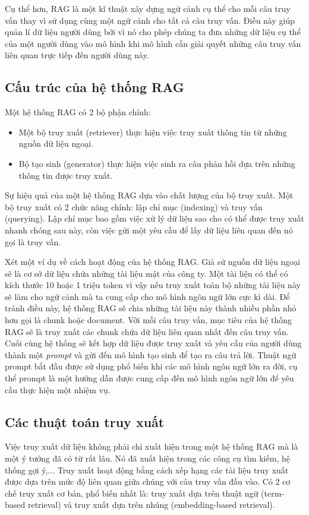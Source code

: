 Cụ thể hơn, RAG là một kĩ thuật xây dựng ngữ cảnh cụ thể cho mỗi câu truy vấn thay vì sử dụng cùng một ngữ cảnh cho tất cả câu truy vấn. Điều này giúp quản lí dữ liệu người dùng bởi vì nó cho phép chúng ta đưa những dữ liệu cụ thể của một người dùng vào mô hình khi mô hình cần giải quyết những câu truy vấn liên quan trực tiếp đến người dùng này.

\vspace{1em}
\subsection{Cấu trúc của hệ thống RAG}

Một hệ thống RAG có 2 bộ phận chính: 
\begin{itemize}
    \item Một bộ truy xuất (retriever) thực hiện việc truy xuất thông tin từ những nguồn dữ liệu ngoại.
    \item Bộ tạo sinh (generator) thực hiện việc sinh ra câu phản hồi dựa trên những thông tin được truy xuất.
\end{itemize}

Sự hiệu quả của một hệ thống RAG dựa vào chất lượng của bộ truy xuất. Một bộ truy xuất có 2 chức năng chính: lập chỉ mục (indexing) và truy vấn (querying). Lập chỉ mục bao gồm việc xử lý dữ liệu sao cho có thể được truy xuất nhanh chóng sau này, còn việc gửi một yêu cầu để lấy dữ liệu liên quan đến nó gọi là truy vấn.

Xét một ví dụ về cách hoạt động của hệ thống RAG. Giả sử nguồn dữ liệu ngoại sẽ là cơ sở dữ liệu chứa những tài liệu mật của công ty. Một tài liệu có thể có kích thước 10 hoặc 1 triệu token vì vậy nếu truy xuất toàn bộ những tài liệu này sẽ làm cho ngữ cảnh mà ta cung cấp cho mô hình ngôn ngữ lớn cực kì dài. Để tránh điều này, hệ thống RAG sẽ chia những tài liệu này thành nhiều phần nhỏ hơn gọi là chunk hoặc document. Với mỗi câu truy vấn, mục tiêu của hệ thống RAG sẽ là truy xuất các chunk chứa dữ liệu liên quan nhất đến câu truy vấn. Cuối cùng hệ thống sẽ kết hợp dữ liệu được truy xuất và yêu cầu của người dùng thành một \textit{prompt} và gửi đến mô hình tạo sinh để tạo ra câu trả lời. Thuật ngữ prompt bắt đầu được sử dụng phổ biến khi các mô hình ngôn ngữ lớn ra đời, cụ thể prompt là một hướng dẫn được cung cấp đến mô hình ngôn ngữ lớn để yêu cầu thực hiện một nhiệm vụ.

\vspace{1em}
\subsection{Các thuật toán truy xuất}
Việc truy xuất dữ liệu không phải chỉ xuất hiện trong một hệ thống RAG mà là một ý tưởng đã có từ rất lâu. Nó đã xuất hiện trong các công cụ tìm kiếm, hệ thống gợi ý,... Truy xuất hoạt động bằng cách xếp hạng các tài liệu truy xuất được dựa trên mức độ liên quan giữa chúng với câu truy vấn đầu vào. Có 2 cơ chế truy xuất cơ bản, phổ biến nhất là: truy xuất dựa trên thuật ngữ (term-based retrieval) và truy xuất dựa trên nhúng (embedding-based retrieval).

